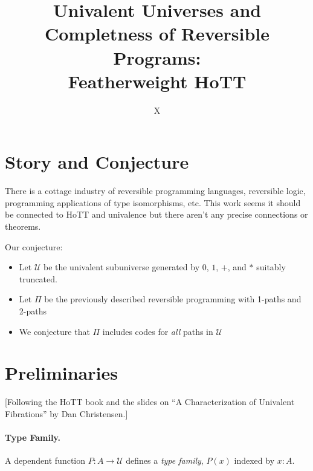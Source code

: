 \documentclass[format=acmlarge,review,natbib]{acmart}
\begin{document}
\title{Univalent Universes and Completness of Reversible Programs: \\
  Featherweight HoTT}

\author{X}

\begin{abstract}
\end{abstract}

\maketitle

\section{Story and Conjecture}

There is a cottage industry of reversible programming languages, reversible logic, programming applications of type isomorphisms, etc. This work seems it should be connected to HoTT and univalence but there aren't any precise connections or theorems.

Our conjecture:

\begin{itemize}
\item Let $\mathcal{U}$ be the univalent subuniverse generated by $0$, $1$, $+$,
  and $*$ suitably truncated.
\item Let $\Pi$ be the previously  described reversible programming with 1-paths and 2-paths
\item We conjecture that $\Pi$ includes codes for \emph{all} paths in $\mathcal{U}$
\end{itemize}

\section{Preliminaries}

[Following the HoTT book and the slides on ``A Characterization of Univalent
Fibrations'' by Dan Christensen.]

\paragraph*{Type Family.} A dependent function $P : A \to \mathcal{U}$ defines a
\emph{type family}, $P(x)$ indexed by $x:A$.
\end{document}
